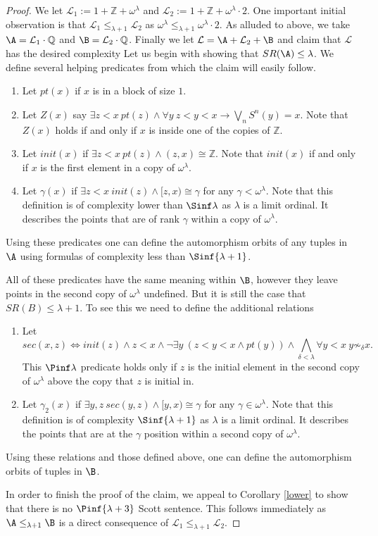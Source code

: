 \documentclass{amsart}
\newcommand{\SR}{SR}
\newcommand{\Q}{\mathbb{Q}}
\newcommand{\Z}{\mathbb{Z}}
\renewcommand{\L}{\mathcal{L}}
\begin{document}
\begin{proof}
We let
$\L_1:=1+\Z+\omega^\lambda$ and $\L_2:=1+\Z+\omega^\lambda\cdot2$.
One important initial observation is that $\L_1\leq_{\lambda+1}\L_2$ as $\omega^\lambda\leq_{\lambda+1}\omega^\lambda\cdot2$.
As alluded to above, we take $\A=\L_1\cdot \Q$ and $\B=\L_2\cdot\Q$.
Finally we let $\L=\A+\L_2+\B$ and claim that $\L$ has the desired complexity
Let us begin with showing that $\SR(\A)\leq\lambda$. We define several helping predicates from which the claim will easily follow.
\begin{enumerate}
    \item Let $pt(x)$ if $x$ is in a block of size $1$. 
    \item Let $Z(x)$ say $\exists z<x ~pt(z)\land \forall y~z<y<x \to
        \bigvee_{n} S^n(y)=x.$ Note that $Z(x)$ holds if and only if $x$ is inside one of the copies of $\Z$.
    \item Let $init(x)$ if $\exists z<x ~ pt(z) \land (z,x)\cong\Z.$ Note that
        $init(x)$ if and only if $x$ is the first element in a copy of $\omega^\lambda$.
    \item Let $\gamma(x)$ if $\exists z<x ~init(z)\land [z,x)\cong\gamma$ for
        any $\gamma<\omega^\lambda$. Note that this definition is of complexity
        lower than $\Sinf\lambda$ as $\lambda$ is a limit ordinal. It describes
        the points that are of rank $\gamma$ within a copy of $\omega^{\lambda}$.
\end{enumerate}
Using these predicates one can define the automorphism orbits of any tuples in
$\A$ using formulas of complexity less than $\Sinf{\lambda+1}$.

All of these predicates have the same meaning within $\B$, however they leave
points in the second copy of $\omega^\lambda$ undefined. But it is still the case that $\SR(B)\leq\lambda+1$. To see this we need to define the additional relations
\begin{enumerate}
    \item Let 
        \[sec(x,z)\iff init(z) \land z<x \land \lnot\exists y~ \left(z<y<x\land
            pt(y)\right) \land \bigwedge_{\delta<\lambda}\forall y<x~ y\not\sim_\delta
        x.\]
        This $\Pinf\lambda$ predicate holds only if $z$ is the initial element in the second copy of $\omega^{\lambda}$ above the copy that $z$ is initial in.
    \item Let $\gamma_2(x)$ if $\exists y,z ~ sec(y,z) \land [y,x)\cong\gamma$ for any $\gamma\in\omega^\lambda$. Note that this definition is of complexity $\Sinf{\lambda+1}$ as $\lambda$ is a limit ordinal. It describes the points that are at the $\gamma$ position within a second copy of $\omega^{\lambda}$.
\end{enumerate}
Using these relations and those defined above, one can define the automorphism
orbits of tuples in $\B$.

In order to finish the proof of the claim, we appeal to Corollary \ref{lower} to
show that there is no $\Pinf{\lambda+3}$ Scott sentence.
This follows immediately as $\A\leq_{\lambda+1} \B$ is a direct consequence of $\L_1\leq_{\lambda+1}\L_2$.
\end{proof}
\end{document}
